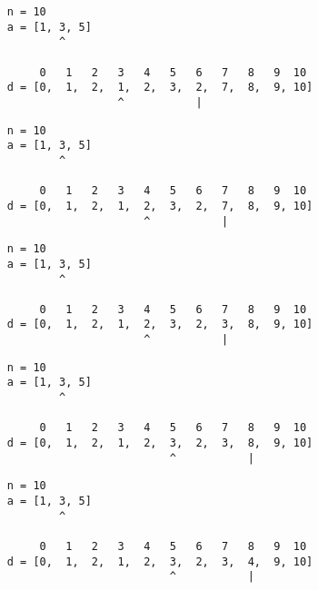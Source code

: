 \begin{frame}[fragile]
\begin{verbatim}
     n = 10
     a = [1, 3, 5]
             ^

          0   1   2   3   4   5   6   7   8   9  10
     d = [0,  1,  2,  1,  2,  3,  2,  7,  8,  9, 10]
                      ^           |
\end{verbatim}
\end{frame}
\addtocounter{framenumber}{-1}

\begin{frame}[fragile]
\begin{verbatim}
     n = 10
     a = [1, 3, 5]
             ^

          0   1   2   3   4   5   6   7   8   9  10
     d = [0,  1,  2,  1,  2,  3,  2,  7,  8,  9, 10]
                          ^           |
\end{verbatim}
\end{frame}
\addtocounter{framenumber}{-1}

\begin{frame}[fragile]
\begin{verbatim}
     n = 10
     a = [1, 3, 5]
             ^

          0   1   2   3   4   5   6   7   8   9  10
     d = [0,  1,  2,  1,  2,  3,  2,  3,  8,  9, 10]
                          ^           |
\end{verbatim}
\end{frame}
\addtocounter{framenumber}{-1}

\begin{frame}[fragile]
\begin{verbatim}
     n = 10
     a = [1, 3, 5]
             ^

          0   1   2   3   4   5   6   7   8   9  10
     d = [0,  1,  2,  1,  2,  3,  2,  3,  8,  9, 10]
                              ^           |
\end{verbatim}
\end{frame}
\addtocounter{framenumber}{-1}

\begin{frame}[fragile]
\begin{verbatim}
     n = 10
     a = [1, 3, 5]
             ^

          0   1   2   3   4   5   6   7   8   9  10
     d = [0,  1,  2,  1,  2,  3,  2,  3,  4,  9, 10]
                              ^           |
\end{verbatim}
\end{frame}
\addtocounter{framenumber}{-1}

